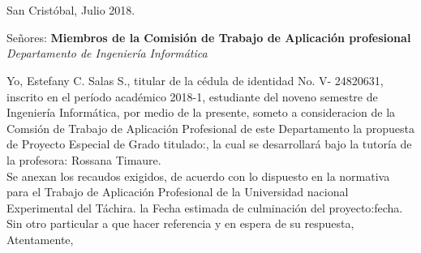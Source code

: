 \chapter*{}
\pagestyle{empty}
\thispagestyle{empty}
\begin{flushright}
San Crist\'obal, Julio 2018.
\end{flushright}


\begin{flushleft}
Se\~nores:
\textbf{Miembros de la Comisi\'on de Trabajo de Aplicaci\'on profesional}
\textit{Departamento de Ingenier\'ia Inform\'atica}
\end{flushleft}



	Yo, Estefany C. Salas S., titular de la c\'edula de identidad No. V- 24820631, inscrito en el per\'iodo acad\'emico 2018-1, estudiante del noveno semestre de Ingenier\'ia Inform\'atica, por medio de la presente, someto a consideracion de la Comsi\'on de Trabajo de Aplicaci\'on Profesional de este Departamento la propuesta de Proyecto Especial de Grado titulado:\textbf{}, la cual se desarrollar\'a bajo la tutor\'ia de la profesora: Rossana Timaure.\\
	
	
	Se anexan los recaudos exigidos, de acuerdo con lo dispuesto en la normativa para el Trabajo de Aplicaci\'on Profesional de la Universidad nacional Experimental del T\'achira. la Fecha estimada de culminaci\'on del proyecto:fecha.\\
	
	
	Sin otro particular a que hacer referencia y en espera de su respuesta,\\
	
	
	Atentamente,\\
	
	
	\begin{center}
	
	
	
	\end{center}
	 